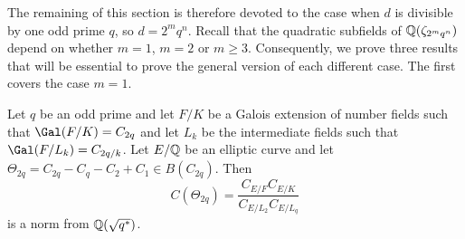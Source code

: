 The remaining of this section is therefore devoted to the case when $d$ is divisible by one odd prime $q$, so $d=2^mq^n$. 
Recall that the quadratic subfields of $\mathbb{Q}(\zeta_{2^mq^n})$ depend on whether $m=1$, $m=2$ or $m\geq 3$. Consequently, we prove three results that will be essential to prove the general version of each different case. The first covers the case $m=1$.

\begin{lemma}\label{lem_C2p}
    Let $q$ be an odd prime and let $F/K$ be a Galois extension of number fields such that $\Gal(F/K)=C_{2q}$ and let $L_k$ be the intermediate fields such that $\Gal(F/L_k)=C_{2q/k}$. Let $E/\mathbb{Q}$ be an elliptic curve and let $\Theta_{2q}=C_{2q}-C_q-C_2+C_1\in B(C_{2q})$. Then
    $$C(\Theta_{2q})=\frac{C_{E/F}C_{E/K}}{C_{E/L_2}C_{E/L_q}}$$
    is a norm from $\mathbb{Q}(\sqrt{q^*})$.
\end{lemma}

